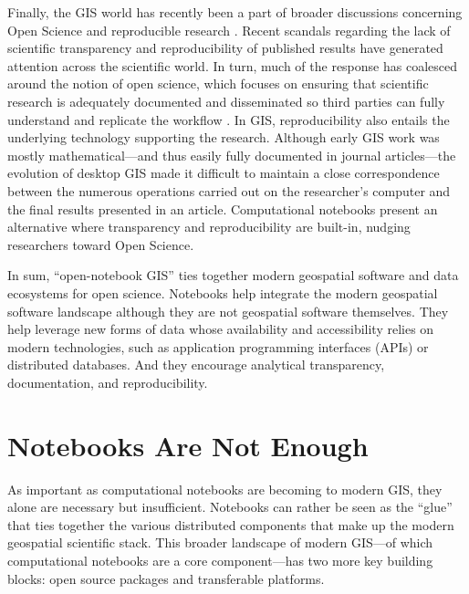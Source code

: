 \documentclass[11pt,letterpaper]{article}
\begin{document}
Finally, the GIS world has recently been a part of broader discussions concerning Open Science and reproducible research \citep{brunsdon_quantitative_2016,kedron_reproducibility_2019}. Recent scandals regarding the lack of scientific transparency and reproducibility of published results have generated attention across the scientific world. In turn, much of the response has coalesced around the notion of open science, which focuses on ensuring that scientific research is adequately documented and disseminated so third parties can fully understand and replicate the workflow \citep{koster_fueling_2020,poorthuis_being_2019,rey_show_2009}. In GIS, reproducibility also entails the underlying technology supporting the research. Although early GIS work was mostly mathematical---and thus easily fully documented in journal articles---the evolution of desktop GIS made it difficult to maintain a close correspondence between the numerous operations carried out on the researcher's computer and the final results presented in an article. Computational notebooks present an alternative where transparency and reproducibility are built-in, nudging researchers toward Open Science.

In sum, \enquote{open-notebook GIS} ties together modern geospatial software and data ecosystems for open science. Notebooks help integrate the modern geospatial software landscape although they are not geospatial software themselves. They help leverage new forms of data whose availability and accessibility relies on modern technologies, such as application programming interfaces (APIs) or distributed databases. And they encourage analytical transparency, documentation, and reproducibility.

\section{Notebooks Are Not Enough}

As important as computational notebooks are becoming to modern GIS, they alone are necessary but insufficient. Notebooks can rather be seen as the \enquote{glue} that ties together the various distributed components that make up the modern geospatial scientific stack. This broader landscape of modern GIS---of which computational notebooks are a core component---has two more key building blocks: open source packages and transferable platforms.
\end{document}
